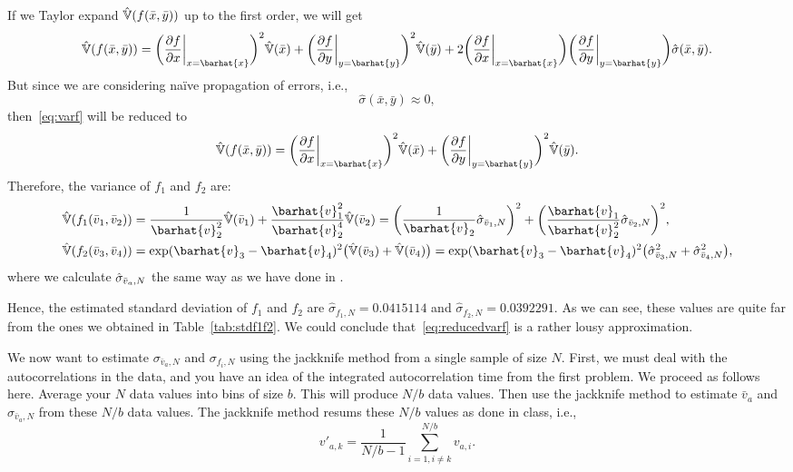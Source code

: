 \Answer{}
If we Taylor expand \(\hat{\mathbb{V}}(f(\bar{x}, \bar{y}))\) up to the first order, we will
get
%
\begin{equation}\label{eq:varf}
    \hat{\Var}(f(\bar{x}, \bar{y})) =
    \biggl(\frac{ \partial f }{ \partial x } \at{x = \barhat{x}}\biggr)^2 \hat{\Var}(\bar{x}) +
    \biggl(\frac{ \partial f }{ \partial y } \at{y = \barhat{y}}\biggr)^2 \hat{\Var}(\bar{y}) +
    2\biggl(\frac{ \partial f }{ \partial x } \at{x = \barhat{x}}\biggr)
    \biggl(\frac{ \partial f }{ \partial y } \at{y = \barhat{y}}\biggr)
    \hat{\sigma}(\bar{x}, \bar{y}).
\end{equation}
%
But since we are considering naïve propagation of errors, i.e.,
%
\begin{equation}
    \hat{\sigma}(\bar{x}, \bar{y}) \approx 0,
\end{equation}
%
then~\eqref{eq:varf} will be reduced to
%
\begin{equation}\label{eq:reducedvarf}
    \hat{\Var}(f(\bar{x}, \bar{y})) =
    \biggl(\frac{ \partial f }{ \partial x } \at{x = \barhat{x}}\biggr)^2 \hat{\Var}(\bar{x}) +
    \biggl(\frac{ \partial f }{ \partial y } \at{y = \barhat{y}}\biggr)^2 \hat{\Var}(\bar{y}).
\end{equation}
%
Therefore, the variance of \(f_1\) and \(f_2\) are:
%
\begin{align}
    \hat{\Var}(f_1(\bar{v}_1, \bar{v}_2)) & =
    \frac{ 1 }{ \barhat{v}^2_2 } \hat{\Var}(\bar{v}_1) +
    \frac{ \barhat{v}^2_1 }{ \barhat{v}^4_2 } \hat{\Var}(\bar{v}_2) =
    \biggl(\frac{ 1 }{ \barhat{v}_2 } \sgbar{1}\biggr)^2 +
    \biggl(\frac{ \barhat{v}_1 }{ \barhat{v}^2_2 } \sgbar{2} \biggr)^2, \\
    \hat{\Var}(f_2(\bar{v}_3, \bar{v}_4)) & =
    \exp( \barhat{v}_3 - \barhat{v}_4 )^2 \bigl(\hat{\Var}(\bar{v}_3) + \hat{\Var}(\bar{v}_4)\bigr) =
    \exp( \barhat{v}_3 - \barhat{v}_4 )^2 \bigl(\sgbar{3}^2 + \sgbar{4}^2\bigr),
\end{align}
%
where we calculate \(\hat{\sigma}_{\bar{v}_a,N}\) the same way as we have done in \label{p1q2}.

Hence, the estimated standard deviation of \(f_1\) and \(f_2\) are
\(\hat{\sigma}_{f_1,N} = 0.0415114\) and \(\hat{\sigma}_{f_2,N} = 0.0392291\).
As we can see, these values are quite far from the ones we obtained in
Table~\ref{tab:stdf1f2}.
We could conclude that~\eqref{eq:reducedvarf} is a rather lousy approximation.


\Question{} We now want to estimate \(\sigma_{\bar{v}_a,N}\) and \(\sigma_{f_i,N}\) using
the jackknife method from a single sample of size \(N\).
First, we must deal with the autocorrelations in the data, and you have an idea of the
integrated autocorrelation time from the first problem. We proceed as follows here. Average
your \(N\) data values into bins of size \(b\). This will produce \(N/b\) data values.
Then use the jackknife method to estimate \(\bar{v}_a\) and \(\sigma_{\bar{v}_a,N}\) from
these \(N/b\) data values. The jackknife method resums these \(N/b\) values as done in class,
i.e.,
%
\begin{equation}
    v'_{a,k} = \frac{ 1 }{ N / b - 1 } \sum_{i=1, i \neq k}^{N/b} v_{a,i}.
\end{equation}

